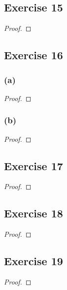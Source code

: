 \documentclass[14pt]{extarticle}
\begin{document}
\subsection{Exercise 15}

\begin{proof}

\end{proof}

\subsection{Exercise 16}

\subsubsection{(a)}

\begin{proof}

\end{proof}

\subsubsection{(b)}

\begin{proof}

\end{proof}

\subsection{Exercise 17}

\begin{proof}

\end{proof}

\subsection{Exercise 18}

\begin{proof}

\end{proof}

\subsection{Exercise 19}

\begin{proof}

\end{proof}
\end{document}
